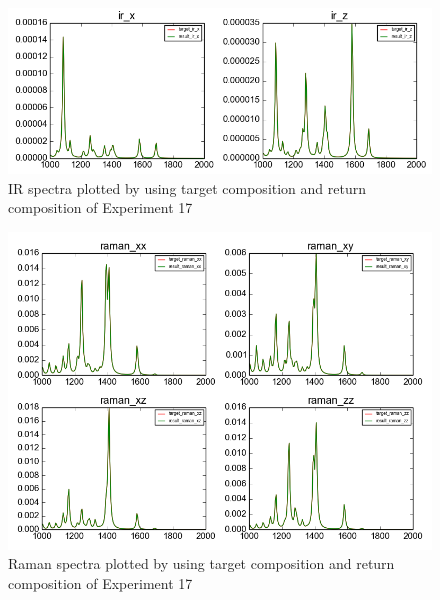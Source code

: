 \begin{figure}[!ht] \label{fig:4.2}
\centering
\includegraphics[scale=0.5]{Figures/chapter4_result_target_plotting_5datapoint_ir.png}
\caption{IR spectra plotted by using target composition and return composition of Experiment 17} 
\end{figure}

\begin{figure}[!ht] \label{fig:4.3}
\centering
\includegraphics[scale=0.5]{Figures/chapter4_result_target_plotting_5datapoint_raman.png}
\caption{Raman spectra plotted by using target composition and return composition of Experiment 17} 
\end{figure}

